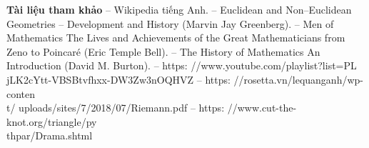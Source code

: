 \begin{multicols}{2}
	\vskip 0.1cm
	\textbf{\color{lichsutoanhoc}\color{lichsutoanhoc}Tài liệu tham khảo}
	\vskip 0.1cm
	-- Wikipedia tiếng Anh.
	\vskip 0.1cm
	-- Euclidean and Non--Euclidean Geometries -- Development and History (Marvin Jay Greenberg).
	\vskip 0.1cm
	-- Men of Mathematics The Lives and Achievements of the Great Mathematicians from Zeno to Poincaré (Eric Temple Bell).
	\vskip 0.1cm
	-- The History of Mathematics An Introduction (David M. Burton).
	\vskip 0.1cm
	-- https: //www.youtube.com/playlist?list=PL\\jLK2cYtt-VBSBtvfhxx-DW3Zw3nOQHVZ
	\vskip 0.1cm
	-- https: //rosetta.vn/lequanganh/wp-conten\\t/
	uploads/sites/7/2018/07/Riemann.pdf
	\vskip 0.1cm
	-- https: //www.cut-the-knot.org/triangle/py\\
	thpar/Drama.shtml
\end{multicols}